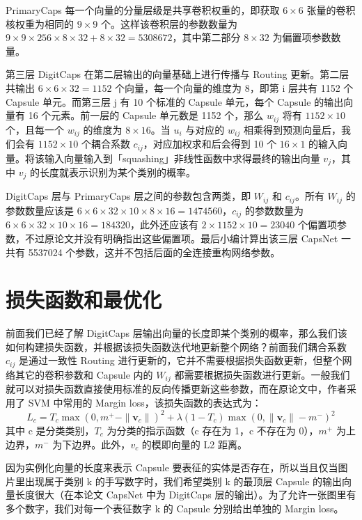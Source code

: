 PrimaryCaps 每一个向量的分量层级是共享卷积权重的，即获取 $6\times6$ 张量的卷积核权重为相同的 $9\times9$ 个。这样该卷积层的参数数量为 $9\times9\times256\times8\times32+8\times32=5308672$，其中第二部分 $8\times32$ 为偏置项参数数量。

第三层 DigitCaps 在第二层输出的向量基础上进行传播与 Routing 更新。第二层共输出 $6\times6\times32=1152$ 个向量，每一个向量的维度为 8，即第 i 层共有 1152 个 Capsule 单元。而第三层 j 有 10 个标准的 Capsule 单元，每个 Capsule 的输出向量有 16 个元素。前一层的 Capsule 单元数是 1152 个，那么 $w_{ij}$ 将有 $1152\times10$ 个，且每一个 $w_{ij}$ 的维度为 $8\times16$。当 $u_i$ 与对应的 $w_{ij}$ 相乘得到预测向量后，我们会有 $1152\times10$ 个耦合系数 $c_{ij}$，对应加权求和后会得到 10 个 $16\times1$ 的输入向量。将该输入向量输入到「squashing」非线性函数中求得最终的输出向量 $v_j$，其中 $v_j$ 的长度就表示识别为某个类别的概率。

DigitCaps 层与 PrimaryCaps 层之间的参数包含两类，即 $W_{ij}$ 和 $c_{ij}$。所有 $W_{ij}$ 的参数数量应该是 $6\times6\times32\times10\times8\times16=1474560$，$c_{ij}$ 的参数数量为 $6\times6\times32\times10\times16=184320$，此外还应该有 $2\times1152\times10=23040$ 个偏置项参数，不过原论文并没有明确指出这些偏置项。最后小编计算出该三层 CapsNet 一共有 5537024 个参数，这并不包括后面的全连接重构网络参数。
\section{损失函数和最优化}
前面我们已经了解 DigitCaps 层输出向量的长度即某个类别的概率，那么我们该如何构建损失函数，并根据该损失函数迭代地更新整个网络？前面我们耦合系数 $c_{ij}$ 是通过一致性 Routing 进行更新的，它并不需要根据损失函数更新，但整个网络其它的卷积参数和 Capsule 内的 $W_{ij}$ 都需要根据损失函数进行更新。一般我们就可以对损失函数直接使用标准的反向传播更新这些参数，而在原论文中，作者采用了 SVM 中常用的 Margin loss，该损失函数的表达式为：
\begin{equation}
	L_c = T_c\max(0,m^{+}-\|\mathbf{v}_c\|)^2+\lambda(1-T_c)\max(0,\|\mathbf{v}_c\|-m^{-})^2
\end{equation}
其中 c 是分类类别，$T_c$ 为分类的指示函数（c 存在为 1，c 不存在为 0），$m^{+}$ 为上边界，$m^{-}$ 为下边界。此外，$v_c$ 的模即向量的 L2 距离。

因为实例化向量的长度来表示 Capsule 要表征的实体是否存在，所以当且仅当图片里出现属于类别 k 的手写数字时，我们希望类别 k 的最顶层 Capsule 的输出向量长度很大（在本论文 CapsNet 中为 DigitCaps 层的输出）。为了允许一张图里有多个数字，我们对每一个表征数字 k 的 Capsule 分别给出单独的 Margin loss。

